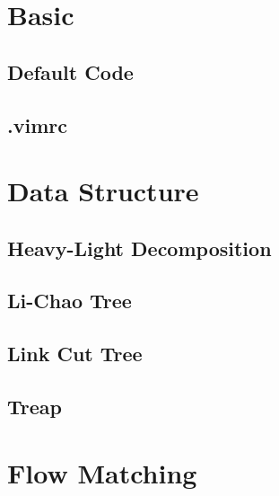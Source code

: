 \documentclass[twocolumn]{article}
\begin{document}
\setlength\parindent{0pt}
\setlength\columnseprule{0.5pt}
\footnotesize

\tableofcontents

\pagestyle{fancy}
\fancyfoot{}
\fancyhead[R]{\thepage}

\section{Basic}

\subsection{Default Code}


\subsection{.vimrc}


\section{Data Structure}

\subsection{Heavy-Light Decomposition}


\subsection{Li-Chao Tree}


\subsection{Link Cut Tree}


\subsection{Treap}


\section{Flow Matching}
\end{document}
